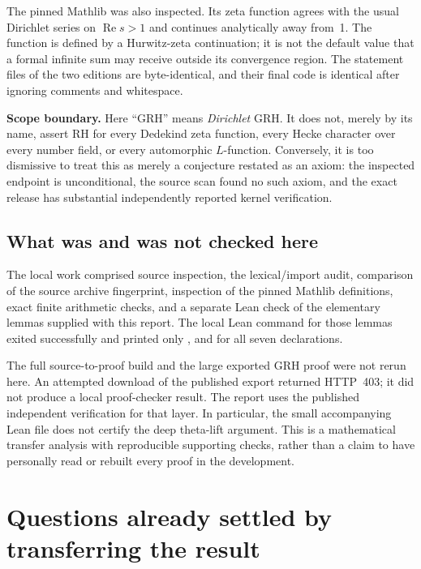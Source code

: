 \documentclass[11pt,letterpaper]{article}
\theoremstyle{definition}\newtheorem{definition}[theorem]{Definition}
\theoremstyle{remark}\newtheorem{remark}[theorem]{Remark}
\newcommand{\re}{\operatorname{Re}}\newcommand{\im}{\operatorname{Im}}
\begin{document}
The pinned Mathlib was also inspected. Its zeta function agrees with the usual Dirichlet series
on $\re s>1$ and continues analytically away from~1. The function
 is defined by a Hurwitz-zeta continuation; it is not the
default value that a formal infinite sum may receive outside its convergence region.
The statement files of the two editions are byte-identical, and their final 
code is identical after ignoring comments and whitespace.

\textbf{Scope boundary.} Here ``GRH'' means \emph{Dirichlet} GRH. It does not, merely by its name,
assert RH for every Dedekind zeta function, every Hecke character over every number field,
or every automorphic $L$-function. Conversely, it is too dismissive to treat this as merely
a conjecture restated as an axiom: the inspected endpoint is unconditional, the source scan found
no such axiom, and the exact release has substantial independently reported kernel verification.

\subsection{What was and was not checked here}
The local work comprised source inspection, the lexical/import audit, comparison of the source
archive fingerprint, inspection of the pinned Mathlib definitions, exact finite arithmetic
checks, and a separate Lean check of the elementary lemmas supplied with this report.
The local Lean command for those lemmas exited successfully and printed only
,  and  for all seven declarations.

The full source-to-proof build and the large exported GRH proof were not rerun here.
An attempted download of the published export returned HTTP~403; it did not produce a local
proof-checker result. The report uses the published independent verification for that layer.
In particular, the small accompanying Lean file does not certify the deep theta-lift argument.
This is a mathematical transfer analysis with reproducible supporting checks, rather than
a claim to have personally read or rebuilt every proof in the development.

\section{Questions already settled by transferring the result}
\end{document}
